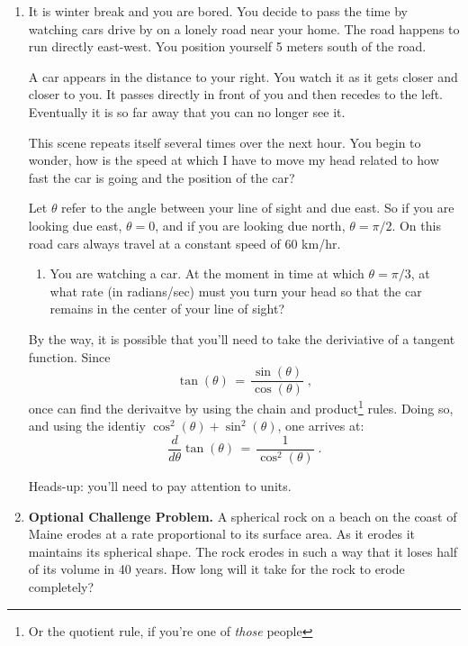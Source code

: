 \documentclass[12pt]{extarticle}
\begin{document}
\begin{enumerate}
\begin{enumerate}
\end{enumerate}

\item It is winter break and you are bored. You decide to pass the
  time by watching cars drive by on a lonely road near your home.  The
  road happens to run directly east-west. You position yourself 5
  meters south of the road.

A car appears in the distance to your right. You watch it as it gets
closer and closer to you.  It passes directly in front of you and then
recedes to the left. Eventually it is so far away that you can no
longer see it.

This scene repeats itself several times over the next hour.  You begin
to wonder, how is the speed at which I have to move my head related to
how fast the car is going and the position of the car?

Let $\theta$ refer to the angle between your line of sight and due
east. So if you are looking due east, $\theta=0$, and if you are
looking due north, $\theta = \pi/2$.  On this road cars always travel
at a constant speed of 60 km/hr. 

\begin{enumerate}

\item You are watching a car.  At the moment in time at which
  $\theta=\pi/3$, at what rate (in radians/sec) must you turn your
  head so that the car remains in the center of your line of sight?

\end{enumerate}


By the way, it is possible that you'll need to take the deriviative of
a tangent function.  Since
\begin{equation}
  \tan(\theta) \, = \, \frac{ \sin(\theta)}{\cos(\theta)} \;,
\end{equation}
once can find the derivaitve by using the chain and
product\footnote{Or the quotient rule, if you're one of \emph{those}
  people} rules.  Doing so, and using the identiy $\cos^2(\theta) +
\sin^2(\theta)$, one arrives at:
\begin{equation}
  \frac{d}{d\theta} \tan(\theta) \, = \,
  \frac{1}{\cos^2(\theta)} \;.
\end{equation}

Heads-up: you'll need to pay attention to units.\\

\item {\bf Optional Challenge Problem.} A spherical rock on a beach on
  the coast of Maine erodes at a rate proportional to its surface
  area. As it erodes it maintains its spherical shape. The rock erodes
  in such a way that it loses half of its volume in 40 years.  How
  long will it take for the rock to erode completely?
\end{enumerate}
\end{document}
